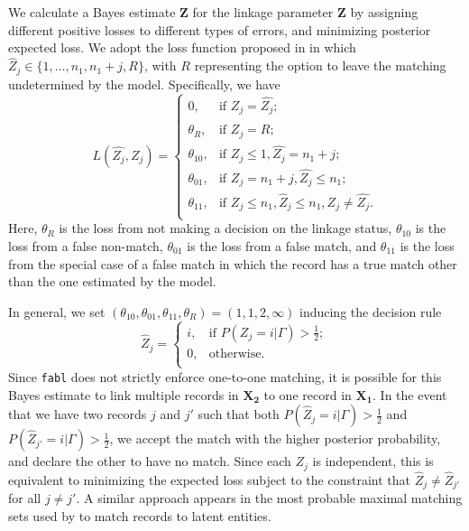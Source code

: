 \documentclass[ba]{imsart}
\begin{document}
We calculate a Bayes estimate \(\hat{\bm{Z}}\) for the linkage parameter \(\bm{Z}\) by assigning different positive losses to different types of errors, and minimizing posterior expected loss. We adopt the loss function proposed in \cite{sadinle_bayesian_2017} in which \(\hat{Z}_j \in \{1, \ldots, n_1, n_1 + j, R\}\), with \(R\) representing the option to leave the matching undetermined by the model. Specifically, we have
	\[L(\hat{Z_j}, Z_j)=\begin{cases} 
		0,  & \text{if } Z_j = \hat{Z_j}; \\
		\theta_R,  & \text{if } \hat{Z_j} = R; \\
		\theta_{10},  & \text{if } Z_j \leq 1,\hat{Z_j} = n_1 + j ; \\
		\theta_{01},  & \text{if } Z_j = n_1 + j,\hat{Z_j} \leq n_1 ; \\
		\theta_{11},  & \text{if } Z_j \leq n_1, \hat{Z}_j \leq n_1, Z_j \neq \hat{Z_j}. \\
	\end{cases}\] 
Here, \(\theta_R\) is the loss from not making a decision on the linkage status, \(\theta_{10}\) is the loss from a false non-match, \(\theta_{01}\) is the loss from a false match, and \(\theta_{11}\) is the loss from the special case of a false match in which the record has a true match other than the one estimated by the model. 

In general, we set $(\theta_{10}, \theta_{01}, \theta_{11}, \theta_R) = (1, 1, 2, \infty)$ inducing the decision rule
	$$\hat{Z}_j =\begin{cases} 
		i,  & \text{if } P(Z_j = i |\Gamma) > \frac{1}{2}; \\
		0,  & \text{otherwise}. \\
	\end{cases}$$
Since \texttt{fabl} does not strictly enforce one-to-one matching, it is possible for this Bayes estimate to link multiple records in $\bm{X_2}$ to one record in $\bm{X_1}$. In the event that we have two records $j$ and $j'$ such that both $P(\hat{Z}_j = i |\Gamma) > \frac{1}{2}$ and $ P(\hat{Z}_{j'} = i |\Gamma) > \frac{1}{2}$, we accept the match with the higher posterior probability, and declare the other to have no match. Since each $Z_j$ is independent, this is equivalent to minimizing the expected loss subject to the constraint that $\hat{Z}_j \neq \hat{Z}_{j'}$ for all $j \neq j'$.  A similar approach appears in the most probable maximal matching sets used by \cite{steorts_bayesian_2016} to match records to latent entities.
\end{document}
